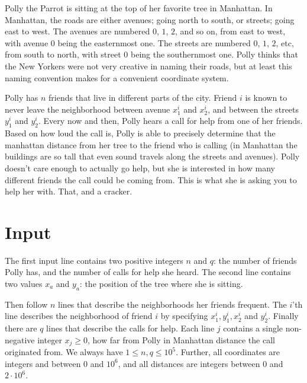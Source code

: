 
\noindent
Polly the Parrot is sitting at the top of her favorite tree in Manhattan. In Manhattan, the roads are either avenues; going north to south, or streets; going east to west. The avenues are numbered $0$, $1$, $2$, and so on, from east to west, with avenue $0$ being the easternmost one. The streets are numbered  $0$, $1$, $2$, etc, from south to north, with street $0$ being the southernmost one. Polly thinks that the New Yorkers were not very creative in naming their roads, but at least this naming convention makes for a convenient coordinate system. 

Polly has $n$ friends that live in different parts of the city. Friend $i$ is known to never leave the neighborhood between avenue $x_1^i$ and $x_2^i$, and between the streets $y_1^i$ and $y_2^i$. Every now and then, Polly hears a call for help from one of her friends. Based on how loud the call is, Polly is able to precisely determine that the manhattan distance from her tree to the friend who is calling (in Manhattan the buildings are so tall that even sound travels along the streets and avenues). Polly doesn't care enough to actually go help, but she is interested in how many different friends the call could be coming from. This is what she is asking you to help her with. That, and a cracker. 

\section*{Input}
The first input line contains two positive integers $n$ and $q$: the number of friends Polly has, and the number of calls for help she heard. The second line contains two values $x_a$ and $y_a$: the position of the tree where she is sitting.

Then follow $n$ lines that describe the neighborhoods her friends frequent. The $i$'th line describes the neighborhood of friend $i$ by specifying $x_1^i, y_1^i, x_2^i$ and $y_2^i$. Finally there are $q$ lines that describe the calls for help. Each line $j$ contains a single non-negative integer $x_j \geq 0$, how far from Polly in Manhattan distance the call originated from. 
%
We always have $1 \leq n, q \leq 10^5$. Further, all coordinates are integers and between $0$ and $10^6$, and all distances are integers between $0$ and $2\cdot 10^6$. 


